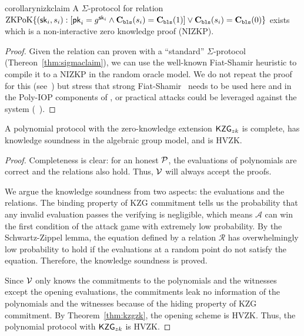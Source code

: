 
\begin{restatable}{corollary}{nizkclaim}
\label{thm:nizkclaim}
A $\Sigma$-protocol for relation $\mathrm{ZKPoK} \{ (\mathsf{sk}_i,s_i) :  [\mathsf{pk}_i=g^{\mathsf{sk}_i} \land \textbf{C}_\texttt{bls}(s_i)=\textbf{C}_\texttt{bls}(1)  ] \lor \textbf{C}_\texttt{bls}(s_i)=\textbf{C}_\texttt{bls}(0) \}$ exists which is a non-interactive zero knowledge proof (NIZKP).
\end{restatable}
    
\begin{proof}
Given the relation can proven with a ``standard'' $\Sigma$-protocol (Thereon~\ref{thm:sigmaclaim}), we can use the well-known Fiat-Shamir heuristic to compile it to a NIZKP in the random oracle model. We do not repeat the proof for this (see~\cite{damgard10,sigma}) but stress that strong Fiat-Shamir~\cite{weakfs} needs to be used here and in the Poly-IOP components of \Sys, or practical attacks could be leveraged against the system (\cf~\cite{weakfsattacks}).
\end{proof}


\begin{theorem}
\label{thm:polyproto}
A polynomial protocol with the zero-knowledge extension $\mathsf{KZG}_{zk}$ is complete, has knowledge soundness in the algebraic group model, and is HVZK.
\end{theorem}

\begin{proof}
Completeness is clear: for an honest $\mathcal{P}$, the evaluations of polynomials are correct and the relations also hold. Thus, $\mathcal{V}$ will always accept the proofs.

We argue the knowledge soundness from two aspects: the evaluations and the relations. The binding property of KZG commitment tells us the probability that any invalid evaluation passes the verifying is negligible, which means $\mathcal{A}$ can win the first condition of the attack game with extremely low probability. By the Schwartz-Zippel lemma, the equation defined by a relation $\mathcal{R}$ has overwhelmingly low probability to hold if the evaluations at a random point do not satisfy the equation. Therefore, the knowledge soundness is proved.

Since $\mathcal{V}$ only knows the commitments to the polynomials and the witnesses except the opening evaluations, the commitments leak no information of the polynomials and the witnesses because of the hiding property of KZG commitment. By Theorem~\ref{thm:kzgzk}, the opening scheme is HVZK. Thus, the polynomial protocol with $\mathsf{KZG}_{zk}$ is HVZK.
\end{proof}

